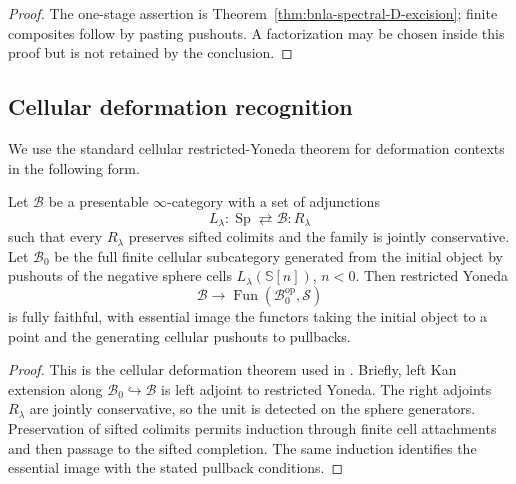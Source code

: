 \begin{proof}
The one-stage assertion is
Theorem~\ref{thm:bnla-spectral-D-excision}; finite composites follow by
pasting pushouts.  A factorization may be chosen inside this proof but is not
retained by the conclusion.
\end{proof}

\subsection{Cellular deformation recognition}

We use the standard cellular restricted-Yoneda theorem for deformation
contexts in the following form.

\begin{theorem}
\label{thm:bnla-cellular-restricted-yoneda}
Let $\mathcal B$ be a presentable $\infty$-category with a set of adjunctions
\[
    L_\lambda:\operatorname{Sp}
    \rightleftarrows
    \mathcal B:R_\lambda
\]
such that every $R_\lambda$ preserves sifted colimits and the family is
jointly conservative.  Let $\mathcal B_0$ be the full finite cellular
subcategory generated from the initial object by pushouts of the negative
sphere cells $L_\lambda(\mathbb S[n])$, $n<0$.  Then restricted Yoneda
\[
    \mathcal B
    \longrightarrow
    \operatorname{Fun}(\mathcal B_0^{\mathrm{op}},\mathcal S)
\]
is fully faithful, with essential image the functors taking the initial object
to a point and the generating cellular pushouts to pullbacks.
\end{theorem}

\begin{proof}
This is the cellular deformation theorem used in
\cite{BrantnerMagidsonNuiten2025}.  Briefly, left Kan extension along
$\mathcal B_0\hookrightarrow\mathcal B$ is left adjoint to restricted Yoneda.
The right adjoints $R_\lambda$ are jointly conservative, so the unit is
detected on the sphere generators.  Preservation of sifted colimits permits
induction through finite cell attachments and then passage to the sifted
completion.  The same induction identifies the essential image with the
stated pullback conditions.
\end{proof}

